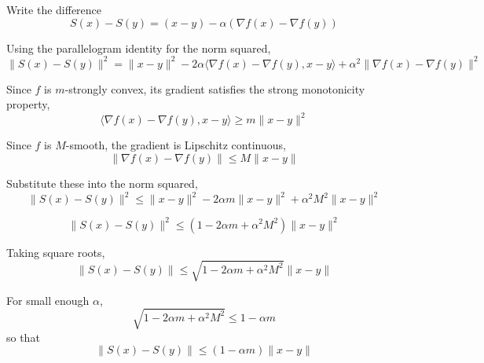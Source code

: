 \documentclass{article}
\begin{document}
Write the difference
\[
S(x) - S(y) = (x - y) - \alpha (\nabla f(x) - \nabla f(y))
\]

Using the parallelogram identity for the norm squared,
\[
\|S(x) - S(y)\|^2 = \|x - y\|^2 - 2 \alpha \langle \nabla f(x) - \nabla f(y), x - y \rangle + \alpha^2 \|\nabla f(x) - \nabla f(y)\|^2
\]

 Since \( f \) is \( m \)-strongly convex, its gradient satisfies the strong monotonicity property,
\[
\langle \nabla f(x) - \nabla f(y), x - y \rangle \geq m \|x - y\|^2
\]

 Since \( f \) is \( M \)-smooth, the gradient is Lipschitz continuous,
\[
\|\nabla f(x) - \nabla f(y)\| \leq M \|x - y\|
\]

Substitute these into the norm squared,
\[
\|S(x) - S(y)\|^2 \leq \|x - y\|^2 - 2 \alpha m \|x - y\|^2 + \alpha^2 M^2 \|x - y\|^2
\]

\[\|S(x) - S(y)\|^2 \leq \left(1 - 2 \alpha m + \alpha^2 M^2 \right) \|x - y\|^2
\]

Taking square roots,
\[
\|S(x) - S(y)\| \leq \sqrt{1 - 2 \alpha m + \alpha^2 M^2} \|x - y\|
\]

For small enough \(\alpha\), 
\[
\sqrt{1 - 2 \alpha m + \alpha^2 M^2} \leq 1 - \alpha m
\]
so that
\[
\|S(x) - S(y)\| \leq (1 - \alpha m) \|x - y\|
\]
    
\end{document}
